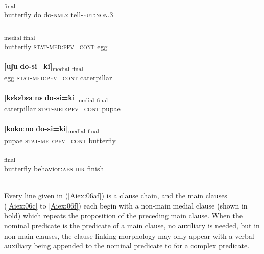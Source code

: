 \documentclass[output=paper]{LSP/langsci}
\begin{document}
\begin{exe}
\ex \label{Aiex:06af}
\begin{xlist}
\ex \label{Aiex:06a}
\textsubscript{final}\\
butterfly do do-\textsc{nmlz} tell-\textsc{fut}:\textsc{non}.\textsc{3}\\
\glt {}\\
\ex \label{Aiex:06b}
\gll [ɛjaːgɛ	do-si=ki]\textsubscript{medial} \underline{\smash{[uʃu]}}\textsubscript{final}\\
butterfly \textsc{stat}-\textsc{med}:\textsc{pfv}=\textsc{cont} egg\\
\glt {}\\
\ex \label{Aiex:06c}
\gll \textbf{[uʃu}	\textbf{do-si=ki]}\textsubscript{medial}	\underline{\smash{[kɛkɛbɛaːnɛ]}}\textsubscript{final}\\
egg	\textsc{stat}-\textsc{med}:\textsc{pfv}=\textsc{cont} caterpillar\\
\glt {}\\
\ex \label{Aiex:06d}
\gll \textbf{[kɛkɛbɛaːnɛ} \textbf{do-si=ki]}\textsubscript{medial} \underline{\smash{[kokoːno]}}\textsubscript{final}\\
caterpillar \textsc{stat}-\textsc{med:}\textsc{pfv}=\textsc{cont} pupae\\
\glt {}\\
\ex \label{Aiex:06e}
\gll \textbf{[kokoːno} \textbf{do-si=ki]}\textsubscript{medial} \underline{\smash{[ɛja:gɛ]}}\textsubscript{final}\\
pupae \textsc{stat}-\textsc{med}:\textsc{pfv}=\textsc{cont} butterfly\\
\glt {}\\
\ex \label{Aiex:06f}
\textsubscript{final}\\
butterfly	behavior:\textsc{abs} \textsc{dir}	finish\\
\glt {}\\
\end{xlist}
\end{exe}

Every line given in (\ref{Aiex:06af}) is a clause chain, and the main clauses (\ref{Aiex:06c} to \ref{Aiex:06f}) each begin with a non-main medial
clause (shown in bold) which repeats the proposition of the preceding main clause. When the nominal
predicate is the predicate of a main clause, no auxiliary is needed, but in non-main clauses, the clause
linking morphology may only appear with a verbal auxiliary being appended to the nominal predicate to
for a complex predicate.
\end{document}
